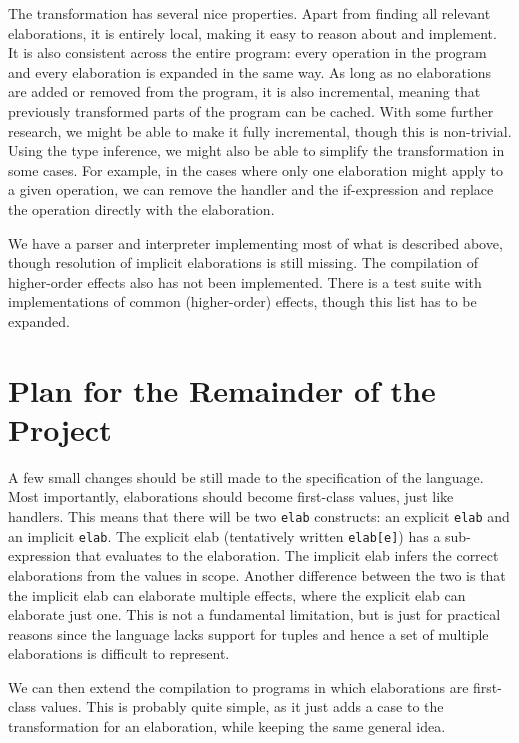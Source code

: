\documentclass{article}
\begin{document}
The transformation has several nice properties. Apart from finding all relevant  elaborations, it is entirely local, making it easy to reason about and implement. It is also consistent across the entire program: every operation in the program and every elaboration is expanded in the same way. As long as no elaborations are added or removed from the program, it is also incremental, meaning that previously transformed parts of the program can be cached. With some further research, we might be able to make it fully incremental, though this is non-trivial. Using the type inference, we might also be able to simplify the transformation in some cases. For example, in the cases where only one elaboration might apply to a given operation, we can remove the handler and the if-expression and replace the operation directly with the elaboration.

We have a parser and interpreter implementing most of what is described above, though resolution of implicit elaborations is still missing. The compilation of higher-order effects also has not been implemented. There is a test suite with implementations of common (higher-order) effects, though this list has to be expanded.

\section{Plan for the Remainder of the Project}

A few small changes should be still made to the specification of the language. Most importantly, elaborations should become first-class values, just like handlers. This means that there will be two \lstinline|elab| constructs: an explicit \lstinline|elab| and an implicit \lstinline|elab|. The explicit elab (tentatively written \lstinline{elab[e]}) has a sub-expression that evaluates to the elaboration. The implicit elab infers the correct elaborations from the values in scope. Another difference between the two is that the implicit elab can elaborate multiple effects, where the explicit elab can elaborate just one. This is not a fundamental limitation, but is just for practical reasons since the language lacks support for tuples and hence a set of multiple elaborations is difficult to represent.

We can then extend the compilation to programs in which elaborations are first-class values. This is probably quite simple, as it just adds a case to the transformation for an elaboration, while keeping the same general idea.
\end{document}
